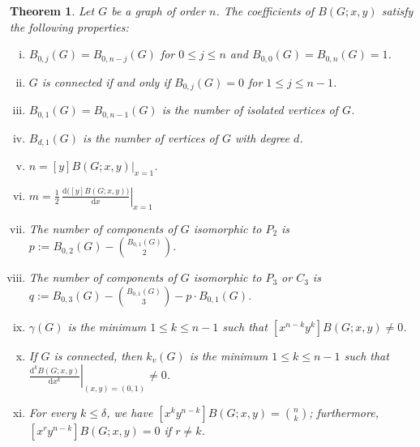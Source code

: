 \documentclass[review]{elsarticle}
\newtheorem{theorem}{Theorem}[section]
\renewcommand{\d}{\delta}
\newcommand{\g}{\gamma}
\begin{document}
\begin{theorem}\label{t:coef}
Let $G$ be a graph of order $n$. The coefficients of $B(G;x,y)$ satisfy the following properties:
 \begin{enumerate}[i)]
    \item $B_{0,j}(G) = B_{0,n-j}(G)$ for $0 \leq j \leq n$ and $B_{0,0}(G) = B_{0,n}(G) = 1$.
 
     \item $G$ is connected if and only if $B_{0,j}(G) = 0$ for $1 \leq j \leq n-1$. 
     
     \item $B_{0,1}(G) = B_{0,n-1}(G)$ is the number of isolated vertices of $G$.
     
     \item $B_{d,1}(G)$ is the number of vertices of $G$ with degree $d$. 
     
     \item $n=[y]B(G;x,y)\big|_{x=1}$. 
     
     \item $m=\displaystyle\frac12\,\left.\frac{\text{d}\big([y]B(G;x,y)\big)}{\text{d}x}\right|_{x=1}$

     \item The number of components of $G$ isomorphic to $P_{2}$ is $p:=B_{0,2}(G)-\binom{B_{0,1}(G)}{2}$.

     \item The number of components of $G$ isomorphic to $P_{3}$ or $C_{3}$ is $q:=B_{0,3}(G) - \binom{B_{0,1}(G)}{3} - p\cdot B_{0,1}(G)$.

     \item $\g(G)$ is the minimum $1\le k\leq n-1$ such that $[x^{n-k}y^{k}]B(G;x,y)\neq0$.

     \item If $G$ is connected, then $k_v(G)$ is the minimum $1\le k\le n-1$ such that $\displaystyle\left.\frac{\text{d}^{k} B(G;x,y)}{\text{d}x^k}\right|_{(x,y)=(0,1)}\neq0$.

     \item For every $k\leq\d$, we have $[x^ky^{n-k}]B(G;x,y)=\binom{n}{k}$; furthermore, $[x^ry^{n-k}]B(G;x,y)=0$ if $r\neq k$.
 \end{enumerate}
\end{theorem}
\end{document}
